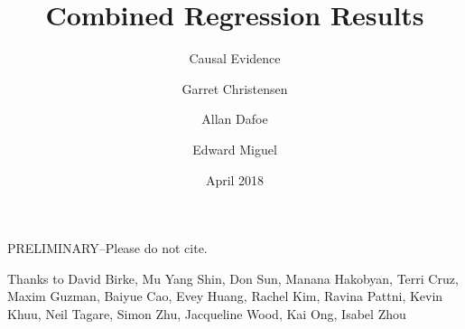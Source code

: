 \documentclass{beamer}
\title[Data Sharing and Citations] %
{Combined Regression Results}
\subtitle
{Causal Evidence} %
\author[Christensen, Dafoe, Miguel] %
{Garret Christensen\inst{1} \and Allan Dafoe\inst{2} \and Edward Miguel\inst{3}}
\institute[Universities of Somewhere and Elsewhere] %
{
  \inst{1}%
  Berkeley Institute for Data Science, UC Berkeley
  \and
  \inst{2}%
  Department of Political Science, Yale University
  \and
  \inst{3}%
  Department of Economics, UC Berkeley}
\date[Short Occasion] %
{April 2018}
\begin{document}
{ %
    \begin{frame}[plain]
     \end{frame}
}

\begin{frame}
  \titlepage
  \begin{center}
  \begin{large}
  PRELIMINARY--Please do not cite.
  \end{large}
  \end{center}
\end{frame}

\begin{frame}
Thanks to David Birke, Mu Yang Shin, Don Sun, Manana Hakobyan, Terri Cruz, Maxim Guzman, Baiyue Cao, Evey Huang, Rachel Kim, Ravina Pattni, Kevin Khuu, Neil Tagare, Simon Zhu, Jacqueline Wood, Kai Ong, Isabel Zhou
\end{frame}

\end{document}
